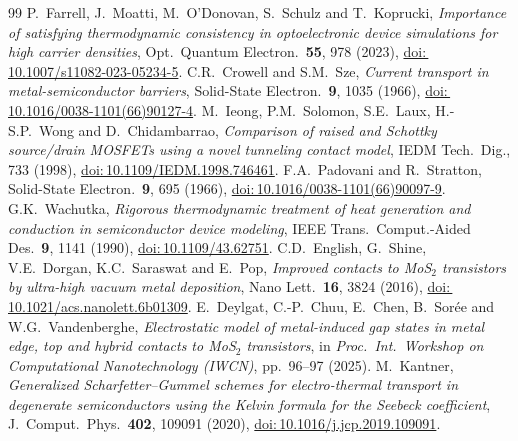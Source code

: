 \documentclass[11pt]{article}
\providecommand{\doi}[1]{\href{https://doi.org/#1}{doi:\,#1}}
\begin{document}
\begin{thebibliography}{99}
 P.~Farrell, J.~Moatti, M.~O'Donovan, S.~Schulz and T.~Koprucki, \textit{Importance of satisfying thermodynamic consistency in optoelectronic device simulations for high carrier densities}, Opt.\ Quantum Electron.\ \textbf{55}, 978 (2023), \doi{10.1007/s11082-023-05234-5}.
 C.R.~Crowell and S.M.~Sze, \textit{Current transport in metal-semiconductor barriers}, Solid-State Electron.\ \textbf{9}, 1035 (1966), \doi{10.1016/0038-1101(66)90127-4}.
 M.~Ieong, P.M.~Solomon, S.E.~Laux, H.-S.P.~Wong and D.~Chidambarrao, \textit{Comparison of raised and Schottky source/drain MOSFETs using a novel tunneling contact model}, IEDM Tech.\ Dig., 733 (1998), \doi{10.1109/IEDM.1998.746461}.
 F.A.~Padovani and R.~Stratton, Solid-State Electron.\ \textbf{9}, 695 (1966), \doi{10.1016/0038-1101(66)90097-9}.
 G.K.~Wachutka, \textit{Rigorous thermodynamic treatment of heat generation and conduction in semiconductor device modeling}, IEEE Trans.\ Comput.-Aided Des.\ \textbf{9}, 1141 (1990), \doi{10.1109/43.62751}.
 C.D.~English, G.~Shine, V.E.~Dorgan, K.C.~Saraswat and E.~Pop, \textit{Improved contacts to MoS$_2$ transistors by ultra-high vacuum metal deposition}, Nano Lett.\ \textbf{16}, 3824 (2016), \doi{10.1021/acs.nanolett.6b01309}.
 E.~Deylgat, C.-P.~Chuu, E.~Chen, B.~Sor\'ee and W.G.~Vandenberghe, \textit{Electrostatic model of metal-induced gap states in metal edge, top and hybrid contacts to MoS$_2$ transistors}, in \textit{Proc.\ Int.\ Workshop on Computational Nanotechnology (IWCN)}, pp.\ 96--97 (2025).
 M.~Kantner, \textit{Generalized Scharfetter--Gummel schemes for electro-thermal transport in degenerate semiconductors using the Kelvin formula for the Seebeck coefficient}, J.\ Comput.\ Phys.\ \textbf{402}, 109091 (2020), \doi{10.1016/j.jcp.2019.109091}.
\end{thebibliography}
\end{document}
